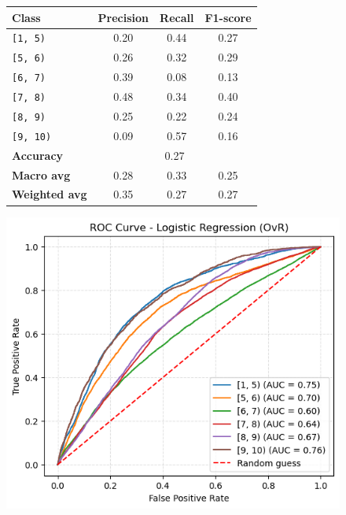 \begin{figure}[ht]
    \centering
    \begin{minipage}{0.45\textwidth}
        \centering
        \label{tab:logistic_report_rating}
        \small
        \begin{tabular}{lccc}
        \hline
        \textbf{Class} & \textbf{Precision} & \textbf{Recall} & \textbf{F1-score}\\
        \hline
        \texttt{[1, 5)}   & 0.20 & 0.44 & 0.27 \\
        \texttt{[5, 6)}   & 0.26 & 0.32 & 0.29 \\
        \texttt{[6, 7)}   & 0.39 & 0.08 & 0.13 \\
        \texttt{[7, 8)}   & 0.48 & 0.34 & 0.40 \\
        \texttt{[8, 9)}   & 0.25 & 0.22 & 0.24 \\
        \texttt{[9, 10)}  & 0.09 & 0.57 & 0.16 \\
        \hline
        \textbf{Accuracy}    & \multicolumn{3}{c}{0.27} \\
        \textbf{Macro avg}   & 0.28 & 0.33 & 0.25 \\
        \textbf{Weighted avg}& 0.35 & 0.27 & 0.27 \\
        \hline
        \end{tabular}
        \end{minipage}
    \hfill
    \begin{minipage}{0.4\textwidth} 
    \centering
    \includegraphics[width=\textwidth]{plotsss/log_roc_curves_rating.png} 
    \label{fig:log_roc_curves_rating} 
    \end{minipage}
\end{figure}





